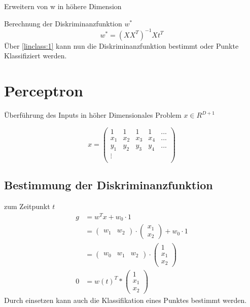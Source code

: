 \documentclass{article}
\begin{document}
Erweitern von w in höhere Dimension

Berechnung der Diskriminanzfunktion $w^*$
$$ w^* = (X X^T)^{-1}X t^T $$
Über \ref{linclass:1} kann nun die Diskriminanzfunktion bestimmt oder Punkte Klassifiziert werden.

\section{Perceptron}
Überführung des Inputs in höher Dimensionales Problem $x \in \!R^{D+1}$

$$x = \begin{pmatrix}
1 & 1 & 1 & 1 & ... \\
x_1 & x_2 & x_3 & x_4 & ...\\
y_1 & y_2 & y_3 & y_4 & ...\\
\vdots\\
\end{pmatrix}$$

\subsection{Bestimmung der Diskriminanzfunktion}

zum Zeitpunkt $t$
\begin{equation}
\begin{aligned}
	g &= w^T x+ w_{0} \cdot 1
	\\
	&= \begin{pmatrix}
	w_1 & w_2
	\end{pmatrix}
	\cdot
	\begin{pmatrix}
	x_1\\
	x_2
	\end{pmatrix}
	+ w_0 \cdot 1
	\\
	&= \begin{pmatrix}
	w_0 & w_1 & w_2 
	\end{pmatrix}
		\cdot
	\begin{pmatrix}
	1\\
	x_1\\
	x_2
	\end{pmatrix}
	\\
	0 &= 
	 w(t)^T * 
	\begin{pmatrix}
	1\\
	x_1\\
	x_2
	\end{pmatrix}
\end{aligned}
\end{equation} 
Durch einsetzen kann auch die Klassifikation eines Punktes bestimmt werden.
\end{document}
